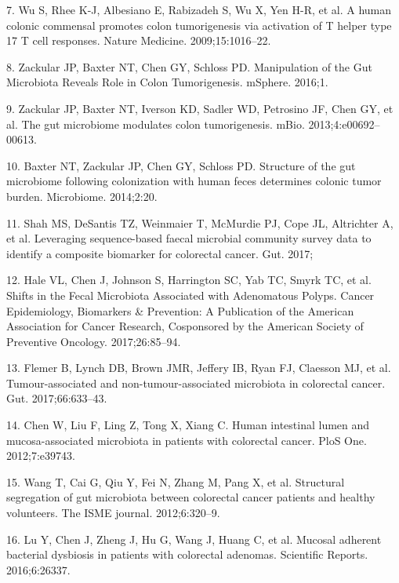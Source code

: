 \documentclass[12pt,]{article}
\begin{document}
\hypertarget{ref-wu_human_2009}{}
7. Wu S, Rhee K-J, Albesiano E, Rabizadeh S, Wu X, Yen H-R, et al. A
human colonic commensal promotes colon tumorigenesis via activation of T
helper type 17 T cell responses. Nature Medicine. 2009;15:1016--22.

\hypertarget{ref-zackular_manipulation_2016}{}
8. Zackular JP, Baxter NT, Chen GY, Schloss PD. Manipulation of the Gut
Microbiota Reveals Role in Colon Tumorigenesis. mSphere. 2016;1.

\hypertarget{ref-zackular_gut_2013}{}
9. Zackular JP, Baxter NT, Iverson KD, Sadler WD, Petrosino JF, Chen GY,
et al. The gut microbiome modulates colon tumorigenesis. mBio.
2013;4:e00692--00613.

\hypertarget{ref-baxter_structure_2014}{}
10. Baxter NT, Zackular JP, Chen GY, Schloss PD. Structure of the gut
microbiome following colonization with human feces determines colonic
tumor burden. Microbiome. 2014;2:20.

\hypertarget{ref-shah_leveraging_2017}{}
11. Shah MS, DeSantis TZ, Weinmaier T, McMurdie PJ, Cope JL, Altrichter
A, et al. Leveraging sequence-based faecal microbial community survey
data to identify a composite biomarker for colorectal cancer. Gut. 2017;

\hypertarget{ref-hale_shifts_2017}{}
12. Hale VL, Chen J, Johnson S, Harrington SC, Yab TC, Smyrk TC, et al.
Shifts in the Fecal Microbiota Associated with Adenomatous Polyps.
Cancer Epidemiology, Biomarkers \& Prevention: A Publication of the
American Association for Cancer Research, Cosponsored by the American
Society of Preventive Oncology. 2017;26:85--94.

\hypertarget{ref-flemer_tumour-associated_2017}{}
13. Flemer B, Lynch DB, Brown JMR, Jeffery IB, Ryan FJ, Claesson MJ, et
al. Tumour-associated and non-tumour-associated microbiota in colorectal
cancer. Gut. 2017;66:633--43.

\hypertarget{ref-chen_human_2012}{}
14. Chen W, Liu F, Ling Z, Tong X, Xiang C. Human intestinal lumen and
mucosa-associated microbiota in patients with colorectal cancer. PloS
One. 2012;7:e39743.

\hypertarget{ref-wang_structural_2012}{}
15. Wang T, Cai G, Qiu Y, Fei N, Zhang M, Pang X, et al. Structural
segregation of gut microbiota between colorectal cancer patients and
healthy volunteers. The ISME journal. 2012;6:320--9.

\hypertarget{ref-lu_mucosal_2016}{}
16. Lu Y, Chen J, Zheng J, Hu G, Wang J, Huang C, et al. Mucosal
adherent bacterial dysbiosis in patients with colorectal adenomas.
Scientific Reports. 2016;6:26337.
\end{document}

